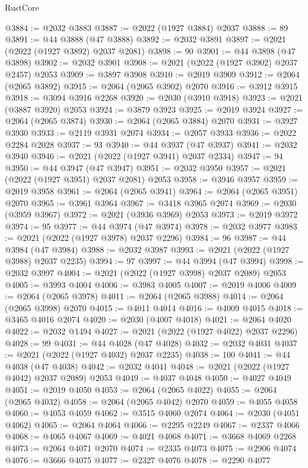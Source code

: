 \begin{lexlean}{RustCore}
\begin{coremodule}
@3884 := @2032 @3883
@3887 := @2022 (@1927 @3884) @2037
@3888 := 89
@3891 := @44 @3888 (@47 @3888)
@3892 := @2032 @3891
@3897 := @2021 (@2022 (@1927 @3892) @2037 @2081)
@3898 := 90
@3901 := @44 @3898 (@47 @3898)
@3902 := @2032 @3901
@3908 := @2021 (@2022 (@1927 @3902) @2037 @2457) @2053
@3909 := @3897 @3908
@3910 := @2019 @3909
@3912 := @2064 (@2065 @3892)
@3915 := @2064 (@2065 @3902) @2070
@3916 := @3912 @3915
@3918 := @3094 @3916 @2268
@3920 := @2030 (@3910 @3918)
@3923 := @2021 (@3887 @3920) @2053
@3924 := @3879 @3923
@3925 := @2019 @3924
@3927 := @2064 (@2065 @3874)
@3930 := @2064 (@2065 @3884) @2070
@3931 := @3927 @3930
@3933 := @2119 @3931 @2074
@3934 := @2057 @3933
@3936 := @2022 @2284 @2028
@3937 := 93
@3940 := @44 @3937 (@47 @3937)
@3941 := @2032 @3940
@3946 := @2021 (@2022 (@1927 @3941) @2037 @2334)
@3947 := 94
@3950 := @44 @3947 (@47 @3947)
@3951 := @2032 @3950
@3957 := @2021 (@2022 (@1927 @3951) @2037 @2081) @2053
@3958 := @3946 @3957
@3959 := @2019 @3958
@3961 := @2064 (@2065 @3941)
@3964 := @2064 (@2065 @3951) @2070
@3965 := @3961 @3964
@3967 := @3418 @3965 @2074
@3969 := @2030 (@3959 @3967)
@3972 := @2021 (@3936 @3969) @2053
@3973 := @2019 @3972
@3974 := 95
@3977 := @44 @3974 (@47 @3974)
@3978 := @2032 @3977
@3983 := @2021 (@2022 (@1927 @3978) @2037 @2296)
@3984 := 96
@3987 := @44 @3984 (@47 @3984)
@3988 := @2032 @3987
@3993 := @2021 (@2022 (@1927 @3988) @2037 @2235)
@3994 := 97
@3997 := @44 @3994 (@47 @3994)
@3998 := @2032 @3997
@4004 := @2021 (@2022 (@1927 @3998) @2037 @2089) @2053
@4005 := @3993 @4004
@4006 := @3983 @4005
@4007 := @2019 @4006
@4009 := @2064 (@2065 @3978)
@4011 := @2064 (@2065 @3988)
@4014 := @2064 (@2065 @3998) @2070
@4015 := @4011 @4014
@4016 := @4009 @4015
@4018 := @3465 @4016 @2074
@4020 := @2030 (@4007 @4018)
@4021 := @2064 @4020
@4022 := @2032 @1494
@4027 := @2021 (@2022 (@1927 @4022) @2037 @2296)
@4028 := 99
@4031 := @44 @4028 (@47 @4028)
@4032 := @2032 @4031
@4037 := @2021 (@2022 (@1927 @4032) @2037 @2235)
@4038 := 100
@4041 := @44 @4038 (@47 @4038)
@4042 := @2032 @4041
@4048 := @2021 (@2022 (@1927 @4042) @2037 @2089) @2053
@4049 := @4037 @4048
@4050 := @4027 @4049
@4051 := @2019 @4050
@4053 := @2064 (@2065 @4022)
@4055 := @2064 (@2065 @4032)
@4058 := @2064 (@2065 @4042) @2070
@4059 := @4055 @4058
@4060 := @4053 @4059
@4062 := @3515 @4060 @2074
@4064 := @2030 (@4051 @4062)
@4065 := @2064 @4064
@4066 := @2295 @2249
@4067 := @2337 @4066
@4068 := @4065 @4067
@4069 := @4021 @4068
@4071 := @3668 @4069 @2268
@4073 := @2064 @4071 @2070
@4074 := @2335 @4073
@4075 := @2906 @4074
@4076 := @3666 @4075
@4077 := @2327 @4076
@4078 := @2290 @4077

\end{coremodule}
\end{lexlean}
